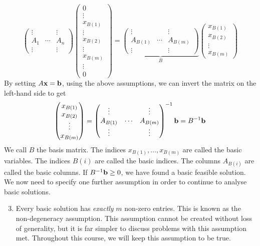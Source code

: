 \[ \begin{pmatrix}
    \vdots & & \vdots \\
    A_1 & \cdots & A_n \\
    \vdots & & \vdots
\end{pmatrix} \begin{pmatrix}
    0 \\ \vdots \\ x_{B(1)} \\ \vdots \\ x_{B(2)} \\ \vdots \\ x_{B(m)} \\ \vdots \\ 0
\end{pmatrix} = \underbrace{\begin{pmatrix}
    \vdots & & \vdots \\
    A_{B(1)} & \cdots & A_{B(m)} \\
    \vdots & & \vdots
\end{pmatrix}}_{B} \begin{pmatrix}
    x_{B(1)} \\
    x_{B(2)} \\
    \vdots \\
    x_{B(m)}
\end{pmatrix} \]
By setting \( A \vb x = \vb b \), using the above assumptions, we can invert the matrix on the left-hand side to get
\[ \begin{pmatrix}
    x_{B(1)} \\
    x_{B(2)} \\
    \vdots \\
    x_{B(m)}
\end{pmatrix} = \begin{pmatrix}
    \vdots & & \vdots \\
    A_{B(1)} & \cdots & A_{B(m)} \\
    \vdots & & \vdots
\end{pmatrix}^{-1} \vb b = B^{-1} \vb b \]
We call \( B \) the basis matrix. The indices \( x_{B(1)}, \dots, x_{B(m)} \) are called the basic variables. The indices \( B(i) \) are called the basic indices. The columns \( A_{B(i)} \) are called the basic columns. If \( B^{-1} \vb b \geq 0 \), we have found a basic feasible solution. We now need to specify one further assumption in order to continue to analyse basic solutions.
\begin{enumerate}[A:]
    \setcounter{enumi}{2}
    \item Every basic solution has \textit{exactly} \( m \) non-zero entries. This is known as the non-degeneracy assumption. This assumption cannot be created without loss of generality, but it is far simpler to discuss problems with this assumption met. Throughout this course, we will keep this assumption to be true.
\end{enumerate}


